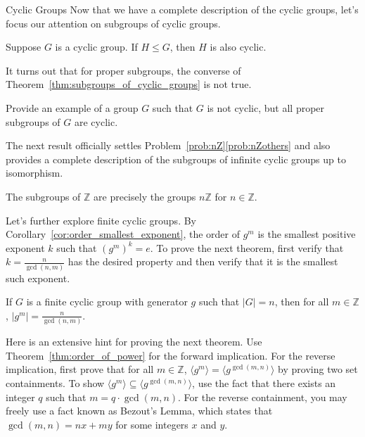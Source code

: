 \begin{section}{Cyclic Groups}
Now that we have a complete description of the cyclic groups, let's focus our attention on subgroups of cyclic groups.  

\begin{theorem}\label{thm:subgroups_of_cyclic_groups}
Suppose $G$ is a cyclic group. If $H\leq G$, then $H$ is also cyclic.
\end{theorem}

It turns out that for proper subgroups, the converse of Theorem~\ref{thm:subgroups_of_cyclic_groups} is not true.

\begin{problem}
Provide an example of a group $G$ such that $G$ is not cyclic, but all proper subgroups of $G$ are cyclic.
\end{problem}

The next result officially settles Problem~\ref{prob:nZ}\ref{prob:nZothers} and also provides a complete description of the subgroups of infinite cyclic groups up to isomorphism.

\begin{corollary}\label{cor:subgroups_of_Z}
The subgroups of $\mathbb{Z}$ are precisely the groups $n\mathbb{Z}$ for $n\in \mathbb{Z}$.
\end{corollary}

Let's further explore finite cyclic groups.  By Corollary~\ref{cor:order_smallest_exponent}, the order of $g^m$ is the smallest positive exponent $k$ such that $(g^m)^k=e$. To prove the next theorem, first verify that $k=\frac{n}{\gcd(n,m)}$ has the desired property and then verify that it is the smallest such exponent.

\begin{theorem}\label{thm:order_of_power}
If $G$ is a finite cyclic group with generator $g$ such that $|G|=n$, then for all $m\in\mathbb{Z}$, $\displaystyle |g^m|=\frac{n}{\gcd(n,m)}$.
\end{theorem}

Here is an extensive hint for proving the next theorem. Use Theorem~\ref{thm:order_of_power} for the forward implication. For the reverse implication, first prove that for all $m\in\mathbb{Z}$, $\langle g^m\rangle=\langle g^{\gcd(m,n)}\rangle$ by proving two set containments. To show $\langle g^m\rangle\subseteq \langle g^{\gcd(m,n)}\rangle$, use the fact that there exists an integer $q$ such that $m=q\cdot \gcd(m,n)$. For the reverse containment, you may freely use a fact known as Bezout's Lemma, which states that $\gcd(m,n)=nx+my$ for some integers $x$ and $y$.


\end{section}
